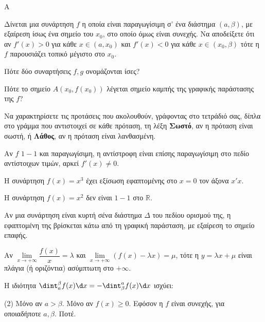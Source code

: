 \begin{thema}{A}
\begin{erwthma}
    \item Δίνεται μια συνάρτηση $ f $ η οποία είναι παραγωγίσιμη σ’ ένα διάστημα $ (a,\beta) $, με εξαίρεση ίσως ένα σημείο του $ x_0 $, στο οποίο όμως είναι συνεχής. Να αποδείξετε ότι αν $ f'(x)>0 $ για κάθε $ x\in(a,x_0) $ και $ f'(x)<0 $ για κάθε $ x\in(x_0,\beta) $ τότε η $ f $ παρουσιάζει τοπικό μέγιστο στο $ x_0 $. 
    \item Πότε δύο συναρτήσεις $f, g$ ονομάζονται ίσες?
    \item Πότε το σημείο $A(x_0, f(x_0))$ λέγεται σημείο καμπής της γραφικής παράστασης της $f$?
    \item Να χαρακτηρίσετε τις προτάσεις που ακολουθούν, γράφοντας στο τετράδιό σας, δίπλα στο γράμμα που αντιστοιχεί σε κάθε πρόταση, τη λέξη \textbf{Σωστό}, αν η πρόταση είναι σωστή, ή \textbf{Λάθος}, αν η πρόταση είναι λανθασμένη.
    \begin{alist}
        \item Αν $f$ $1-1$ και παραγωγίσιμη, η αντίστροφη είναι επίσης παραγωγίσιμη στο πεδίο αντίστοιχων τιμών, αρκεί $f'(x) \ne 0$.
        \item Η συνάρτηση $f(x)=x^3$ έχει εξίσωση εφαπτομένης στο $x=0$ τον άξονα $x'x$.
        \item H συνάρτηση $f(x)=x^2$ δεν είναι $1-1$ στο $\mathbb{R}$.
        \item Αν μια συνάρτηση είναι κυρτή σένα διάστημα $\Delta$ του πεδίου ορισμού της, η εφαπτομένη της βρίσκεται κάτω από τη γραφική παράσταση, με εξαίρεση το σημείο επαφής.
        \item Αν $\lim\limits_{x \to +\infty} \dfrac{f(x)}{x} = \lambda$ και $\lim\limits_{x \to +\infty} (f(x)-\lambda x) = \mu$, τότε η $y=\lambda x + \mu$ είναι πλάγια (ή οριζόντια) ασύμπτωτη στο $+\infty$.
    \end{alist}
    \item Η ιδιότητα $\dint_a^\beta f(x) \d x = - \dint_\beta^a f(x) \d x$ ισχύει:
    \begin{tasks}[label=\let\textdexiakeraia\relax\alph*.](2)
        \task Μόνο αν $a > \beta$.
        \task Μόνο αν $f(x) \ge 0$.
        \task Εφόσον η $f$ είναι συνεχής, για οποιαδήποτε $a, \beta$.
        \task Ποτέ.
    \end{tasks}
\end{erwthma}
\end{thema}
